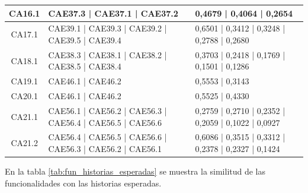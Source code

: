 \documentclass{prgrado}
\begin{document}
\begin{longtable}{|c|p{5cm}|p{4cm}|}
CA16.1 & CAE37.3 | CAE37.1 | CAE37.2 & 0,4679 | 0,4064 | 0,2654 \\ \hline
CA17.1 & CAE39.1 | CAE39.3 | CAE39.2 | CAE39.5 | CAE39.4 & 0,6501 | 0,3412 | 0,3248 | 0,2788 | 0,2680 \\ \hline
CA18.1 & CAE38.3 | CAE38.1 | CAE38.2 | CAE38.5 | CAE38.4 & 0,3703 | 0,2418 | 0,1769 | 0,1501 | 0,1286 \\ \hline
CA19.1 & CAE46.1 | CAE46.2 & 0,5553 | 0,3143 \\ \hline
CA20.1 & CAE46.1 | CAE46.2 & 0,5525 | 0,4330 \\ \hline
CA21.1 & CAE56.1 | CAE56.2 | CAE56.3 | CAE56.4 | CAE56.5 | CAE56.6 & 0,2759 | 0,2710 | 0,2352 | 0,2059 | 0,1022 | 0,0927 \\ \hline
CA21.2 & CAE56.4 | CAE56.5 | CAE56.6 | CAE56.3 | CAE56.2 | CAE56.1 & 0,6086 | 0,3515 | 0,3312 | 0,2378 | 0,2327 | 0,1424 \\ \hline
\end{longtable}

En la tabla \ref{tab:fun_historias_esperadas} se muestra la similitud de las funcionalidades con las historias esperadas.
\end{document}
